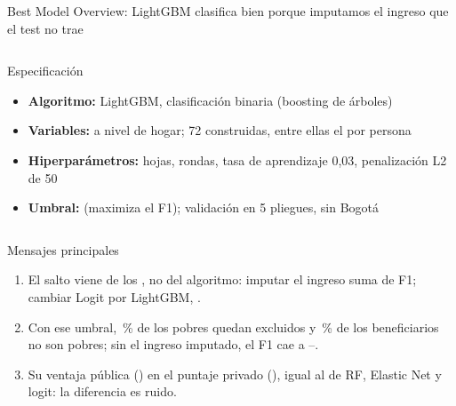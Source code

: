 \begin{frame}{Best Model Overview: LightGBM clasifica bien porque imputamos el ingreso que el test no trae}
  \begin{columns}[T]
    \begin{block}{Especificación}
      \footnotesize
      \begin{itemize}\setlength{\itemsep}{1pt}
        \item \textbf{Algoritmo:} LightGBM, clasificación binaria (boosting de árboles)
        \item \textbf{Variables:} \nNVarsLGBM{} a nivel de hogar; 72 construidas, entre ellas el  por persona
        \item \textbf{Hiperparámetros:} \nHojasLGBM{} hojas, \nRondasLGBM{} rondas, tasa de aprendizaje 0,03, penalización L2 de 50
        \item \textbf{Umbral:} \nThrLGBM{} (maximiza el F1); validación en 5 pliegues, sin Bogotá
      \end{itemize}
    \end{block}
    \vspace{2mm}
    \vspace{2mm}
  \end{columns}
  \begin{block}{Mensajes principales}
    \footnotesize
    \begin{enumerate}\setlength{\itemsep}{1pt}
      \item El salto viene de los , no del algoritmo: imputar el ingreso suma \nGainIncome{} de F1; cambiar Logit por LightGBM, \nGainAlgo{}.
      \item Con ese umbral, \nUnderLGBM{}\,\% de los pobres quedan excluidos y \nLeakLGBM{}\,\% de los beneficiarios no son pobres; sin el ingreso imputado, el F1 cae a \nFoneSurveyMin{}--\nFoneSurveyShort{}.
      \item Su ventaja pública (\kgLGBM)  en el puntaje privado (\kgpLGBM), igual al de RF, Elastic Net y logit: la diferencia es ruido.
    \end{enumerate}
  \end{block}
\end{frame}

